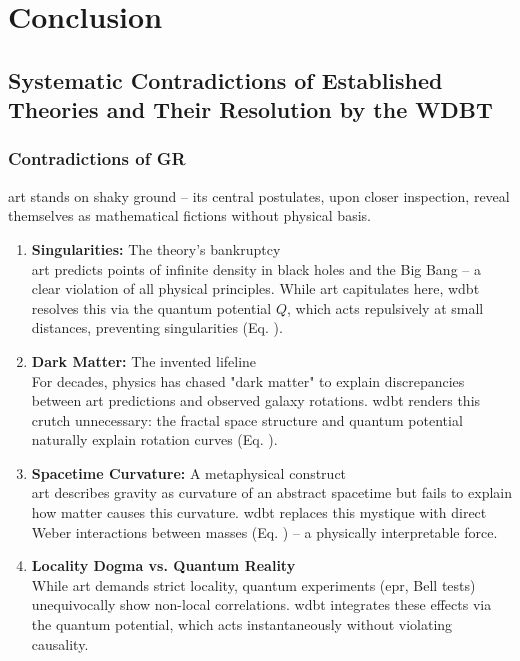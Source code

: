 \chapter{Conclusion}
\section{Systematic Contradictions of Established Theories and Their Resolution by the WDBT}
\subsection{Contradictions of GR}
\gls{art} stands on shaky ground – its central postulates, upon closer inspection, reveal themselves as mathematical fictions without physical basis.
\begin{enumerate}
    \item \textbf{Singularities:} The theory's bankruptcy\\\gls{art} predicts points of infinite density in black holes and the Big Bang – a clear violation of all physical principles. While \gls{art} capitulates here, \gls{wdbt} resolves this via the quantum potential $Q$, which acts repulsively at small distances, preventing singularities (Eq. ).
    \item \textbf{Dark Matter:} The invented lifeline\\For decades, physics has chased "dark matter" to explain discrepancies between \gls{art} predictions and observed galaxy rotations. \gls{wdbt} renders this crutch unnecessary: the fractal space structure and quantum potential naturally explain rotation curves (Eq. ).
    \item \textbf{Spacetime Curvature:} A metaphysical construct\\\gls{art} describes gravity as curvature of an abstract spacetime but fails to explain how matter causes this curvature. \gls{wdbt} replaces this mystique with direct Weber interactions between masses (Eq. ) – a physically interpretable force.
    \item \textbf{Locality Dogma vs. Quantum Reality}\\While \gls{art} demands strict locality, quantum experiments (\gls{epr}, Bell tests) unequivocally show non-local correlations. \gls{wdbt} integrates these effects via the quantum potential, which acts instantaneously without violating causality.
\end{enumerate}

